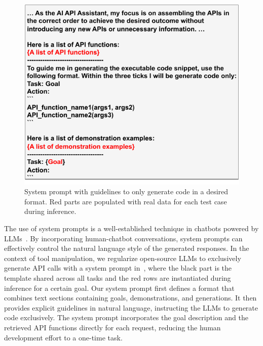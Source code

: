 \begin{figure}
\vspace{-12pt}
\caption{System prompt with guidelines to only generate code in a desired format. Red parts are populated with real data for each test case during inference.}
\vspace{-5pt}
\label{fig:sysprompt}
\includegraphics[width=\linewidth]{plots/sys_prompt_full.pdf}
% 
\end{figure} 
The use of system prompts is a well-established technique in chatbots powered by LLMs~\cite{glaese2022improving}. By incorporating human-chatbot conversations, system prompts can effectively control the natural language style of the generated responses. In the context of tool manipulation, we regularize open-source LLMs to exclusively generate API calls with a system prompt in~, where the black part is the template shared across all tasks and the red rows are instantiated during inference for a certain goal. Our system prompt first defines a format that combines text sections containing goals, demonstrations, and generations. It then provides explicit guidelines in natural language, instructing the LLMs to generate code exclusively. The system prompt incorporates the goal description and the retrieved API functions directly for each request, reducing the human development effort to a one-time task. 

